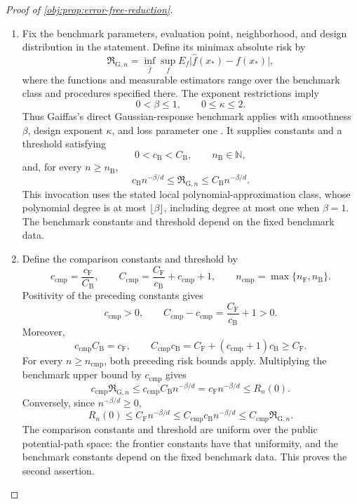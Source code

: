 \begin{proof}[Proof of \cref{obj:prop:error-free-reduction}]
\begin{enumerate}
\item Fix the benchmark parameters, evaluation point, neighborhood, and design distribution in the statement. Define its minimax absolute risk by
\[
\mathfrak R_{\mathrm G,n}
=
\inf_{\widehat f}\sup_f
E_f\bigl|\widehat f(x_*)-f(x_*)\bigr|,
\]
where the functions and measurable estimators range over the benchmark class and procedures specified there. The exponent restrictions imply
\[
0<\beta\le1,
\qquad 0\le\kappa\le2.
\]
Thus Gaiffas's direct Gaussian-response benchmark applies with smoothness \(\beta\), design exponent \(\kappa\), and loss parameter one \citep[Definition 2 and Theorem 1, equations (2.1), (2.4), and (2.5), pp.~3--4]{Gaiffas2005}. It supplies constants and a threshold satisfying
\[
0<c_{\mathrm B}<C_{\mathrm B},
\qquad n_{\mathrm B}\in\mathbb N,
\]
and, for every \(n\ge n_{\mathrm B}\),
\[
c_{\mathrm B}n^{-\beta/d}
\le \mathfrak R_{\mathrm G,n}
\le C_{\mathrm B}n^{-\beta/d}.
\]
This invocation uses the stated local polynomial-approximation class, whose polynomial degree is at most \(\lfloor\beta\rfloor\), including degree at most one when \(\beta=1\). The benchmark constants and threshold depend on the fixed benchmark data.

\item Define the comparison constants and threshold by
\[
c_{\mathrm{cmp}}=\frac{c_{\mathrm F}}{C_{\mathrm B}},
\qquad
C_{\mathrm{cmp}}
=\frac{C_{\mathrm F}}{c_{\mathrm B}}+c_{\mathrm{cmp}}+1,
\qquad
n_{\mathrm{cmp}}=\max\{n_{\mathrm F},n_{\mathrm B}\}.
\]
Positivity of the preceding constants gives
\[
c_{\mathrm{cmp}}>0,
\qquad
C_{\mathrm{cmp}}-c_{\mathrm{cmp}}
=\frac{C_{\mathrm F}}{c_{\mathrm B}}+1>0.
\]
Moreover,
\[
c_{\mathrm{cmp}}C_{\mathrm B}=c_{\mathrm F},
\qquad
C_{\mathrm{cmp}}c_{\mathrm B}
=C_{\mathrm F}+(c_{\mathrm{cmp}}+1)c_{\mathrm B}
\ge C_{\mathrm F}.
\]
For every \(n\ge n_{\mathrm{cmp}}\), both preceding risk bounds apply. Multiplying the benchmark upper bound by \(c_{\mathrm{cmp}}\) gives
\[
c_{\mathrm{cmp}}\mathfrak R_{\mathrm G,n}
\le c_{\mathrm{cmp}}C_{\mathrm B}n^{-\beta/d}
=c_{\mathrm F}n^{-\beta/d}
\le R_n(0).
\]
Conversely, since \(n^{-\beta/d}\ge0\),
\[
R_n(0)
\le C_{\mathrm F}n^{-\beta/d}
\le C_{\mathrm{cmp}}c_{\mathrm B}n^{-\beta/d}
\le C_{\mathrm{cmp}}\mathfrak R_{\mathrm G,n}.
\]
The comparison constants and threshold are uniform over the public potential-path space: the frontier constants have that uniformity, and the benchmark constants depend on the fixed benchmark data. This proves the second assertion.
\end{enumerate}
\end{proof}

